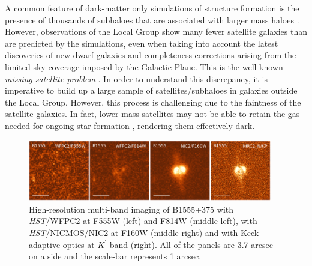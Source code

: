 \documentclass[a4paper,fleqn,usenatbib,useAMS]{mnras}
\begin{document}
A common feature of dark-matter only simulations of structure formation is the presence of thousands of subhaloes that are associated with larger mass haloes \citep[e.g.][]{Springel08}. However, observations of the Local Group show many fewer satellite galaxies than are predicted by the simulations, even when taking into account the latest discoveries of new dwarf galaxies \citep{DES15,Kop15} and completeness corrections arising from the limited sky coverage imposed by the Galactic Plane.  
This is the well-known {\it missing satellite problem} \citep{Klypin1999,Moore1999,S07}. In order to understand this discrepancy, it is imperative to build up a large sample of satellites/subhaloes in galaxies outside the Local Group. However, this process is challenging due to the 
faintness of the satellite galaxies.  In fact, lower-mass satellites may not be able to retain the gas needed for ongoing star formation \citep[e.g.][]{P11}, rendering them effectively dark.  

\begin{figure}
\includegraphics[width=0.95\textwidth]{B1555_gallery.eps}
\caption{High-resolution multi-band imaging of B1555+375 with {\it HST}/WFPC2 at F555W (left) and F814W (middle-left), with {\it HST}/NICMOS/NIC2 at F160W (middle-right) and with Keck adaptive optics at $K^\prime$-band (right). All of the panels are 3.7 arcsec on a side and the scale-bar represents 1 arcsec.}
\label{fig:multiband}
\end{figure}
\end{document}
